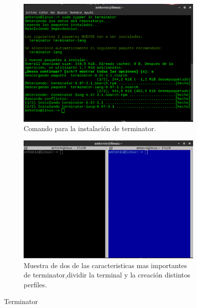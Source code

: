\begin{figure}[H]
    \centering
    \begin{subfigure}[b]{0.55\textwidth}
        \includegraphics[width=\textwidth]{imagenes/img11.eps}
        \caption{Comando para la instalación de terminator.}
        \label{fig10}
    \end{subfigure}
    \begin{subfigure}[b]{0.4\textwidth}
        \includegraphics[width=\textwidth]{imagenes/img10.eps}
        \caption{Muestra de dos de las caracteristicas mas importantes de terminator,dividir la terminal y la creación distintos perfiles.}
        \label{fig11}
    \end{subfigure}
    \caption{Terminator}
\end{figure}



